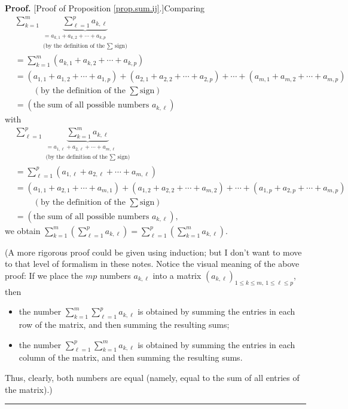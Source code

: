 \documentclass[numbers=enddot,12pt,final,onecolumn,notitlepage]{scrartcl}%
\theoremstyle{definition}
\newenvironment{proof}[1][Proof]{\noindent\textbf{#1.} }{\ \rule{0.5em}{0.5em}}
\let\sumnonlimits\sum
\renewcommand{\sum}{\sumnonlimits\limits}
\begin{document}
\begin{proof}
[Proof of Proposition \ref{prop.sum.ij}.]Comparing%
\begin{align*}
&  \sum_{k=1}^{m}\underbrace{\sum_{\ell=1}^{p}a_{k,\ell}}_{\substack{=a_{k,1}%
+a_{k,2}+\cdots+a_{k,p}\\\text{(by the definition of the }\sum\text{ sign)}%
}}\\
&  =\sum_{k=1}^{m}\left(  a_{k,1}+a_{k,2}+\cdots+a_{k,p}\right) \\
&  =\left(  a_{1,1}+a_{1,2}+\cdots+a_{1,p}\right)  +\left(  a_{2,1}%
+a_{2,2}+\cdots+a_{2,p}\right)  +\cdots+\left(  a_{m,1}+a_{m,2}+\cdots
+a_{m,p}\right) \\
&  \ \ \ \ \ \ \ \ \ \ \left(  \text{by the definition of the }\sum\text{
sign}\right) \\
&  =\left(  \text{the sum of all possible numbers }a_{k,\ell}\right)
\end{align*}
with%
\begin{align*}
&  \sum_{\ell=1}^{p}\underbrace{\sum_{k=1}^{m}a_{k,\ell}}%
_{\substack{=a_{1,\ell}+a_{2,\ell}+\cdots+a_{m,\ell}\\\text{(by the definition
of the }\sum\text{ sign)}}}\\
&  =\sum_{\ell=1}^{p}\left(  a_{1,\ell}+a_{2,\ell}+\cdots+a_{m,\ell}\right) \\
&  =\left(  a_{1,1}+a_{2,1}+\cdots+a_{m,1}\right)  +\left(  a_{1,2}%
+a_{2,2}+\cdots+a_{m,2}\right)  +\cdots+\left(  a_{1,p}+a_{2,p}+\cdots
+a_{m,p}\right) \\
&  \ \ \ \ \ \ \ \ \ \ \left(  \text{by the definition of the }\sum\text{
sign}\right) \\
&  =\left(  \text{the sum of all possible numbers }a_{k,\ell}\right)  ,
\end{align*}
we obtain $\sum_{k=1}^{m}\left(  \sum_{\ell=1}^{p}a_{k,\ell}\right)
=\sum_{\ell=1}^{p}\left(  \sum_{k=1}^{m}a_{k,\ell}\right)  $.

(A more rigorous proof could be given using induction; but I don't want to
move to that level of formalism in these notes. Notice the visual meaning of
the above proof: If we place the $mp$ numbers $a_{k,\ell}$ into a matrix
$\left(  a_{k,\ell}\right)  _{1\leq k\leq m,\ 1\leq\ell\leq p}$, then

\begin{itemize}
\item the number $\sum_{k=1}^{m}\sum_{\ell=1}^{p}a_{k,\ell}$ is obtained by
summing the entries in each row of the matrix, and then summing the resulting sums;

\item the number $\sum_{\ell=1}^{p}\sum_{k=1}^{m}a_{k,\ell}$ is obtained by
summing the entries in each column of the matrix, and then summing the
resulting sums.
\end{itemize}

Thus, clearly, both numbers are equal (namely, equal to the sum of all entries
of the matrix).)
\end{proof}
\end{document}
